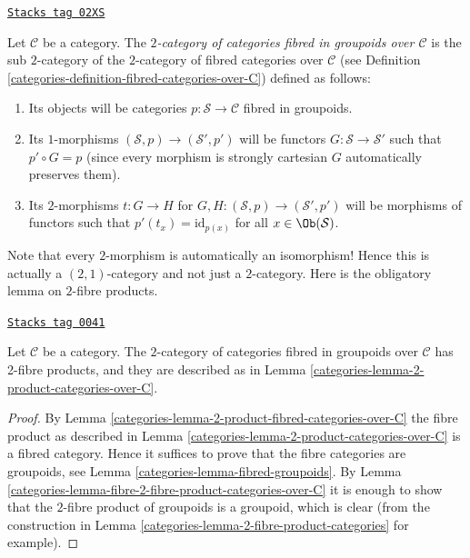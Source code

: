 \begin{definition}
\label{categories-definition-categories-fibred-in-groupoids-over-C}
\href{https://stacks.math.columbia.edu/tag/02XS}{\texttt{Stacks tag 02XS}}

Let $\mathcal{C}$ be a category.
The {\it $2$-category of categories fibred in groupoids over $\mathcal{C}$}
is the sub $2$-category of the $2$-category of fibred categories
over $\mathcal{C}$ (see Definition \ref{categories-definition-fibred-categories-over-C})
defined as follows:
\begin{enumerate}
\item Its objects will be categories
$p : \mathcal{S} \to \mathcal{C}$ fibred in groupoids.
\item Its $1$-morphisms $(\mathcal{S}, p) \to (\mathcal{S}', p')$
will be functors $G : \mathcal{S} \to \mathcal{S}'$ such that
$p' \circ G = p$ (since every morphism is strongly cartesian
$G$ automatically preserves them).
\item Its $2$-morphisms $t : G \to H$ for
$G, H : (\mathcal{S}, p) \to (\mathcal{S}', p')$
will be morphisms of functors
such that $p'(t_x) = \text{id}_{p(x)}$
for all $x \in \Ob(\mathcal{S})$.
\end{enumerate}
\end{definition}

Note that every $2$-morphism is automatically an isomorphism!
Hence this is actually a $(2, 1)$-category and not just a
$2$-category. Here is the obligatory lemma on $2$-fibre products.

\begin{lemma}
\label{categories-lemma-2-product-fibred-categories}
\href{https://stacks.math.columbia.edu/tag/0041}{\texttt{Stacks tag 0041}}

Let $\mathcal{C}$ be a category.
The $2$-category of categories fibred in groupoids
over $\mathcal{C}$ has 2-fibre products, and they are described as in
Lemma \ref{categories-lemma-2-product-categories-over-C}.
\end{lemma}

\begin{proof}

By Lemma \ref{categories-lemma-2-product-fibred-categories-over-C}
the fibre product as described in
Lemma \ref{categories-lemma-2-product-categories-over-C} is a fibred category.
Hence it suffices to prove that the fibre categories are
groupoids, see Lemma \ref{categories-lemma-fibred-groupoids}.
By Lemma \ref{categories-lemma-fibre-2-fibre-product-categories-over-C}
it is enough to show that the $2$-fibre product of groupoids
is a groupoid, which is clear (from the construction in
Lemma \ref{categories-lemma-2-fibre-product-categories} for example).
\end{proof}

